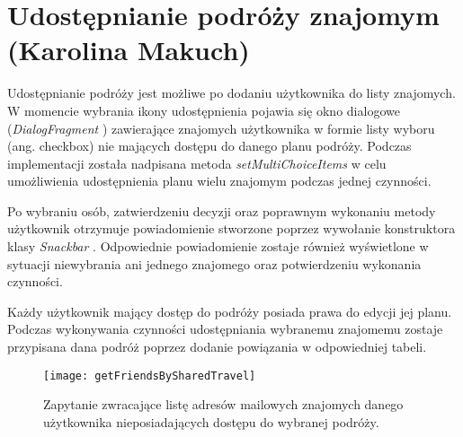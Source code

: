 \section{Udostępnianie podróży znajomym (Karolina Makuch)}

\par  Udostępnianie podróży jest możliwe po dodaniu użytkownika do listy znajomych. W momencie wybrania ikony udostępnienia pojawia się okno dialogowe (\textit{DialogFragment} \cite{DialogFragment}) zawierające znajomych użytkownika w formie  listy wyboru (ang. checkbox) nie mających dostępu do danego planu podróży. Podczas implementacji została nadpisana metoda \textit{setMultiChoiceItems} w celu umożliwienia udostępnienia planu wielu znajomym podczas jednej czynności.
\par  Po wybraniu osób, zatwierdzeniu decyzji oraz poprawnym wykonaniu metody użytkownik otrzymuje powiadomienie stworzone poprzez wywołanie konstruktora klasy \textit{Snackbar}
\cite{Snackbar}. Odpowiednie powiadomienie zostaje również wyświetlone w sytuacji niewybrania ani jednego znajomego oraz potwierdzeniu wykonania czynności.
\par  Każdy użytkownik mający dostęp do podróży posiada prawa do edycji jej planu. Podczas wykonywania czynności udostępniania wybranemu znajomemu zostaje przypisana dana podróż poprzez dodanie powiązania w odpowiedniej tabeli.

\begin{figure}[h]
\centering
\texttt{[image: getFriendsBySharedTravel]}
\caption{Zapytanie zwracające listę adresów mailowych znajomych danego użytkownika nieposiadających dostępu do wybranej podróży.}
\label{fig:getFriendsBySharedTravel}
\end{figure}
\FloatBarrier

